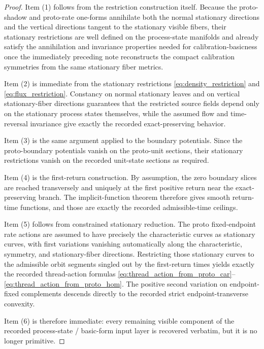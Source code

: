 \documentclass[11pt]{article}
\begin{document}
\begin{proof}
Item (1) follows from the restriction construction itself. Because the proto-shadow and proto-rate one-forms annihilate both the normal stationary directions and the vertical directions tangent to the stationary visible fibers, their stationary restrictions are well defined on the process-state manifolds and already satisfy the annihilation and invariance properties needed for calibration-basicness once the immediately preceding note reconstructs the compact calibration symmetries from the same stationary fiber metrics.

Item (2) is immediate from the stationary restrictions \eqref{eq:density_restriction} and \eqref{eq:flux_restriction}. Constancy on normal stationary leaves and on vertical stationary-fiber directions guarantees that the restricted source fields depend only on the stationary process states themselves, while the assumed flow and time-reversal invariance give exactly the recorded exact-preserving behavior.

Item (3) is the same argument applied to the boundary potentials. Since the proto-boundary potentials vanish on the proto-unit sections, their stationary restrictions vanish on the recorded unit-state sections as required.

Item (4) is the first-return construction. By assumption, the zero boundary slices are reached transversely and uniquely at the first positive return near the exact-preserving branch. The implicit-function theorem therefore gives smooth return-time functions, and those are exactly the recorded admissible-time ceilings.

Item (5) follows from constrained stationary reduction. The proto fixed-endpoint rate actions are assumed to have precisely the characteristic curves as stationary curves, with first variations vanishing automatically along the characteristic, symmetry, and stationary-fiber directions. Restricting those stationary curves to the admissible orbit segments singled out by the first-return times yields exactly the recorded thread-action formulas \eqref{eq:thread_action_from_proto_car}--\eqref{eq:thread_action_from_proto_hom}. The positive second variation on endpoint-fixed complements descends directly to the recorded strict endpoint-transverse convexity.

Item (6) is therefore immediate: every remaining visible component of the recorded process-state / basic-form input layer is recovered verbatim, but it is no longer primitive.
\end{proof}
\end{document}
